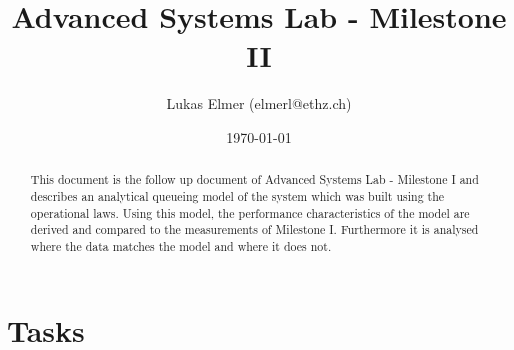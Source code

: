 \documentclass[a4paper]{article}
\title{Advanced Systems Lab - Milestone II}
\author{Lukas Elmer (elmerl@ethz.ch)}
\date{\today}
\begin{document}
\maketitle

\pagebreak

\tableofcontents

\pagebreak

\begin{abstract}

This document is the follow up document of Advanced Systems Lab - Milestone I and describes an analytical queueing model of the system which was built using the operational laws. Using this model, the performance characteristics of the model are derived and compared to the measurements of Milestone I. Furthermore it is analysed where the data matches the model and where it does not.

\end{abstract}

\pagebreak

\section{Tasks}
\end{document}
